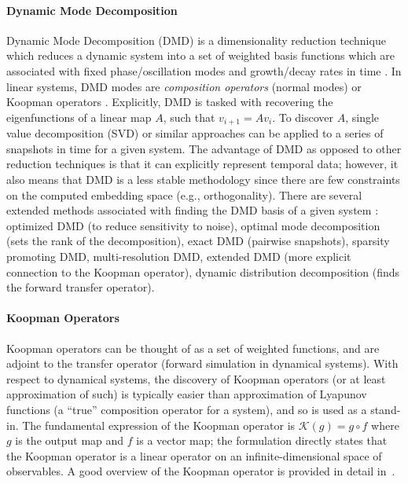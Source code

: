 \paragraph{Dynamic Mode Decomposition} Dynamic Mode Decomposition (DMD) is a dimensionality reduction technique which reduces a dynamic system into a set of weighted basis functions which are associated with fixed phase/oscillation modes and growth/decay rates in time \autocite{schmid2010dynamic}. In linear systems, DMD modes are \emph{composition operators} (normal modes) or Koopman operators \autocite{bruce2019koopman}. Explicitly, DMD is tasked with recovering the eigenfunctions of a linear map $A$, such that $v_{i+1} = A v_{i}$. To discover $A$, single value decomposition (SVD) or similar approaches can be applied to a series of snapshots in time for a given system. The advantage of DMD as opposed to other reduction techniques is that it can explicitly represent temporal data; however, it also means that DMD is a less stable methodology since there are few constraints on the computed embedding space (e.g., orthogonality). There are several extended methods associated with finding the DMD basis of a given system \autocite{chen2012variants}: optimized DMD (to reduce sensitivity to noise), optimal mode decomposition (sets the rank of the decomposition), exact DMD (pairwise snapshots), sparsity promoting DMD, multi-resolution DMD, extended DMD (more explicit connection to the Koopman operator), dynamic distribution decomposition (finds the forward transfer operator).

\paragraph{Koopman Operators} Koopman operators can be thought of as a set of weighted functions, and are adjoint to the transfer operator (forward simulation in dynamical systems). With respect to dynamical systems, the discovery of Koopman operators (or at least approximation of such) is typically easier than approximation of Lyapunov functions (a ``true'' composition operator for a system), and so is used as a stand-in. The fundamental expression of the Koopman operator is $\mathcal{K}(g) = g \circ f$ where $g$ is the output map and $f$ is a vector map; the formulation directly states that the Koopman operator is a linear operator on an infinite-dimensional space of observables. A good overview of the Koopman operator is provided in detail in~\cite{bruce2019koopman}.


